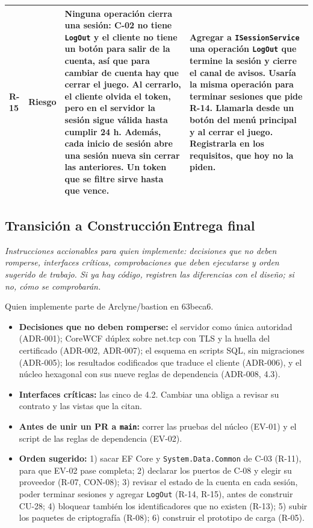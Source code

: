 \documentclass[11pt,letterpaper]{article}
\newcommand{\hint}[1]{{\itshape\color{black!70}#1}\par} %
\newcommand{\greenbadge}[1]{\hspace{0.4em}\colorbox{SADGreenBg}{\scriptsize\bfseries\color{SADGreen}\,#1\,}}
\begin{document}
\begin{xltabular}{\linewidth}{|p{1.4cm}|p{2.8cm}|Y|Y|}
  R-15 & Riesgo & Ninguna operación cierra una sesión: C-02 no tiene \texttt{LogOut} y el cliente no tiene un botón para salir de la cuenta, así que para cambiar de cuenta hay que cerrar el juego. Al cerrarlo, el cliente olvida el token, pero en el servidor la sesión sigue válida hasta cumplir 24 h. Además, cada inicio de sesión abre una sesión nueva sin cerrar las anteriores. Un token que se filtre sirve hasta que vence. & Agregar a \texttt{ISession\allowbreak Service} una operación \texttt{LogOut} que termine la sesión y cierre el canal de avisos. Usaría la misma operación para terminar sesiones que pide R-14. Llamarla desde un botón del menú principal y al cerrar el juego. Registrarla en los requisitos, que hoy no la piden.\\\hline
\end{xltabular}

\subsection{Transición a Construcción\greenbadge{Entrega final}}
\hint{Instrucciones accionables para quien implemente: decisiones que no deben romperse, interfaces críticas, comprobaciones que deben ejecutarse y orden sugerido de trabajo. Si ya hay código, registren las diferencias con el diseño; si no, cómo se comprobarán.}
Quien implemente parte de Arclyne/bastion en 63beca6.
\begin{itemize}[leftmargin=1.2em,itemsep=1pt,topsep=2pt]
  \item \textbf{Decisiones que no deben romperse:} el servidor como única autoridad (ADR-001); CoreWCF dúplex sobre net.tcp con TLS y la huella del certificado (ADR-002, ADR-007); el esquema en scripts SQL, sin migraciones (ADR-005); los resultados codificados que traduce el cliente (ADR-006), y el núcleo hexagonal con sus nueve reglas de dependencia (ADR-008, 4.3).
  \item \textbf{Interfaces críticas:} las cinco de 4.2. Cambiar una obliga a revisar su contrato y las vistas que la citan.
  \item \textbf{Antes de unir un PR a \texttt{main}:} correr las pruebas del núcleo (EV-01) y el script de las reglas de dependencia (EV-02).
  \item \textbf{Orden sugerido:} 1) sacar EF Core y \texttt{System.Data.Common} de C-03 (R-11), para que EV-02 pase completa; 2) declarar los puertos de C-08 y elegir su proveedor (R-07, CON-08); 3) revisar el estado de la cuenta en cada sesión, poder terminar sesiones y agregar \texttt{LogOut} (R-14, R-15), antes de construir CU-28; 4) bloquear también los identificadores que no existen (R-13); 5) subir los paquetes de criptografía (R-08); 6) construir el prototipo de carga (R-05).
\end{itemize}
\end{document}
